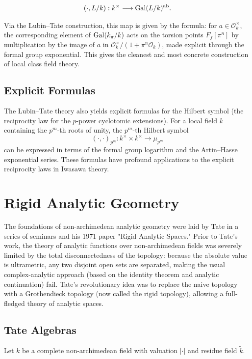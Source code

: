\[
(\cdot, L/k): k^\times \longrightarrow \operatorname{Gal}(L/k)^{\mathrm{ab}}.
\]

Via the Lubin--Tate construction, this map is given by the formula: for \(a \in \mathcal{O}_k^\times\), the corresponding element of \(\operatorname{Gal}(k_\pi/k)\) acts on the torsion points \(F_f[\pi^n]\) by multiplication by the image of \(a\) in \(\mathcal{O}_k^\times/(1 + \pi^n \mathcal{O}_k)\), made explicit through the formal group exponential. This gives the cleanest and most concrete construction of local class field theory.

\subsection{Explicit Formulas}

The Lubin--Tate theory also yields explicit formulas for the Hilbert symbol (the reciprocity law for the \(p\)-power cyclotomic extensions). For a local field \(k\) containing the \(p^m\)-th roots of unity, the \(p^m\)-th Hilbert symbol
\[
(\cdot, \cdot)_{p^m}: k^\times \times k^\times \longrightarrow \mu_{p^m}
\]
can be expressed in terms of the formal group logarithm and the Artin--Hasse exponential series. These formulas have profound applications to the explicit reciprocity laws in Iwasawa theory.

\section{Rigid Analytic Geometry}

The foundations of non-archimedean analytic geometry were laid by Tate in a series of seminars and his 1971 paper "Rigid Analytic Spaces." Prior to Tate's work, the theory of analytic functions over non-archimedean fields was severely limited by the total disconnectedness of the topology: because the absolute value is ultrametric, any two disjoint open sets are separated, making the usual complex-analytic approach (based on the identity theorem and analytic continuation) fail. Tate's revolutionary idea was to replace the naive topology with a Grothendieck topology (now called the rigid topology), allowing a full-fledged theory of analytic spaces.

\subsection{Tate Algebras}

Let \(k\) be a complete non-archimedean field with valuation \(|\cdot|\) and residue field \(\tilde{k}\).

